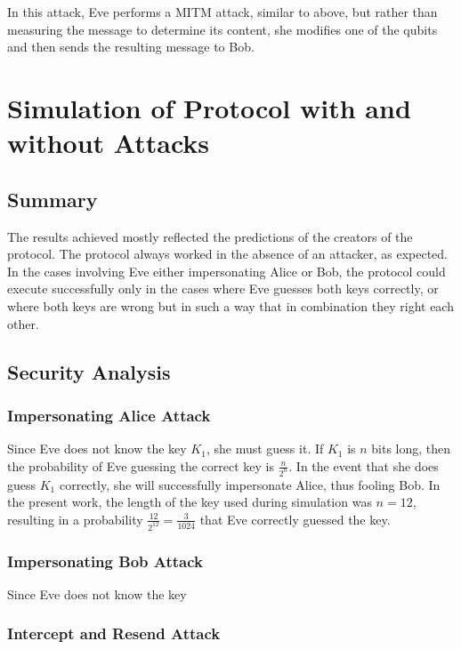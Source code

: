 \documentclass[conference]{IEEEtran}
\begin{document}
In this attack, Eve performs a MITM attack, similar to above, but
rather than measuring the message to determine its content, she modifies
one of the qubits and then sends the resulting message to Bob.

\section{Simulation of Protocol with and without Attacks}

\subsection{Summary}

The results achieved mostly reflected the predictions of the creators
of the protocol. The protocol always worked in the absence of an attacker,
as expected. In the cases involving Eve either impersonating Alice
or Bob, the protocol could execute successfully only in the cases
where Eve guesses both keys correctly, or where both keys are wrong
but in such a way that in combination they right each other.

\subsection{Security Analysis}

\subsubsection{Impersonating Alice Attack}

Since Eve does not know the key $K_{1}$, she must guess it. If $K_{1}$
is $n$ bits long, then the probability of Eve guessing the correct
key is $\frac{n}{2^{n}}$. In the event that she does guess $K_{1}$
correctly, she will successfully impersonate Alice, thus fooling Bob.
In the present work, the length of the key used during simulation
was $n=12$, resulting in a probability $\frac{12}{2^{12}}=\frac{3}{1024}$
that Eve correctly guessed the key. 

\subsubsection{Impersonating Bob Attack}

Since Eve does not know the key 

\subsubsection{Intercept and Resend Attack}
\end{document}
